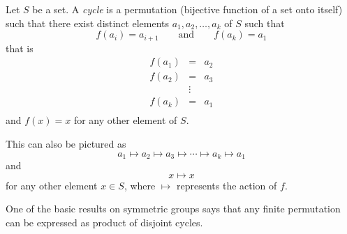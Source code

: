 \documentclass[12pt]{article}
\begin{document}
Let $S$ be a set. A \emph{cycle} is a permutation
(bijective function of a set onto itself)
such that there exist distinct elements $a_1, a_2,\ldots,a_k$ of $S$
such that
$$f(a_i) = a_{i+1}\qquad \mbox{and}\qquad f(a_k)=a_1$$
that is
\begin{eqnarray*}
f(a_1)&=&a_{2}\\
f(a_{2})&=&a_{3}\\
&\vdots&\\
f(a_{k})&=&a_{1}\\
\end{eqnarray*}
and $f(x)=x$ for any other element of $S$.

This can also be pictured as
$$a_1\mapsto a_{2}\mapsto a_{3}\mapsto\cdots\mapsto a_{k}\mapsto a_{1}$$
and $$x\mapsto x$$ 
for any other element $x\in S$, where $\mapsto$ represents the action of $f$.

One of the basic results on symmetric groups
says that any finite permutation can be expressed as product of disjoint cycles.
\end{document}
